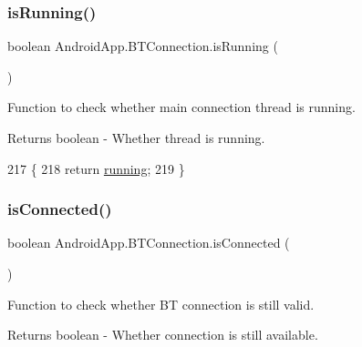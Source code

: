 \subsubsection{\texorpdfstring{is\+Running()}{isRunning()}}
{\footnotesize\ttfamily boolean Android\+App.\+B\+T\+Connection.\+is\+Running (\begin{DoxyParamCaption}{ }\end{DoxyParamCaption})\hspace{0.3cm}{\ttfamily [inline]}}



Function to check whether main connection thread is running. 

\begin{DoxyReturn}{Returns}
boolean -\/ Whether thread is running. 
\end{DoxyReturn}

\begin{DoxyCode}
217                                \{
218         \textcolor{keywordflow}{return} \hyperlink{class_android_app_1_1_b_t_connection_ace01a7a97f5d1abccb61a5d6c6ad9295}{running};
219     \}
\end{DoxyCode}
\mbox{\label{class_android_app_1_1_b_t_connection_a1c91fcddfe9f3b69cd0141742103191a}} 
\subsubsection{\texorpdfstring{is\+Connected()}{isConnected()}}
{\footnotesize\ttfamily boolean Android\+App.\+B\+T\+Connection.\+is\+Connected (\begin{DoxyParamCaption}{ }\end{DoxyParamCaption})\hspace{0.3cm}{\ttfamily [inline]}}



Function to check whether BT connection is still valid. 

\begin{DoxyReturn}{Returns}
boolean -\/ Whether connection is still available. 
\end{DoxyReturn}

